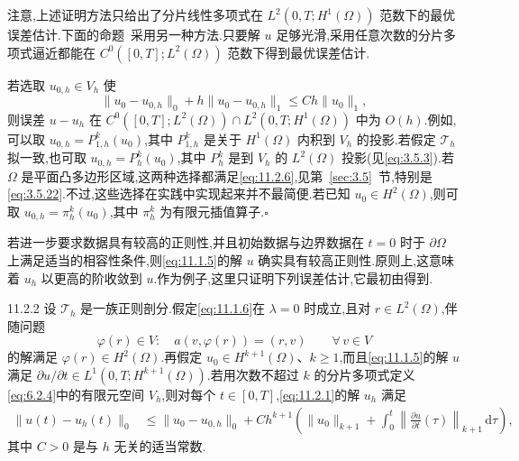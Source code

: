 注意,上述证明方法只给出了分片线性多项式在 \(L^2(0,T;H^1(\Omega))\) 范数下的最优误差估计.下面的命题~采用另一种方法.只要解 \(u\) 足够光滑,采用任意次数的分片多项式逼近都能在 \(C^0([0,T];L^2(\Omega))\) 范数下得到最优误差估计.

\begin{note}
若选取 \(u_{0,h}\in V_h\) 使
\begin{equation}\label{eq:11.2.6}
  \|u_0-u_{0,h}\|_0+h\|u_0-u_{0,h}\|_1\le Ch\|u_0\|_1,
\end{equation}
则误差 \(u-u_h\) 在 \(C^0([0,T];L^2(\Omega))\cap L^2(0,T;H^1(\Omega))\) 中为 \(O(h)\).例如,可以取 \(u_{0,h}=P_{1,h}^k(u_0)\),其中 \(P_{1,h}^k\) 是关于 \(H^1(\Omega)\) 内积到 \(V_h\) 的投影.若假定 \(\mathcal T_h\) 拟一致,也可取 \(u_{0,h}=P_h^k(u_0)\),其中 \(P_h^k\) 是到 \(V_h\) 的 \(L^2(\Omega)\) 投影(见\eqref{eq:3.5.3}).若 \(\Omega\) 是平面凸多边形区域,这两种选择都满足\eqref{eq:11.2.6},见第~\ref{sec:3.5}~节,特别是\eqref{eq:3.5.22}.不过,这些选择在实践中实现起来并不最简便.若已知 \(u_0\in H^2(\Omega)\),则可取 \(u_{0,h}=\pi_h^k(u_0)\),其中 \(\pi_h^k\) 为有限元插值算子.\hfill\(\square\)
\end{note}

若进一步要求数据具有较高的正则性,并且初始数据与边界数据在 \(t=0\) 时于 \(\partial\Omega\) 上满足适当的相容性条件,则\eqref{eq:11.1.5}的解 \(u\) 确实具有较高正则性.原则上,这意味着 \(u_h\) 以更高的阶收敛到 \(u\).作为例子,这里只证明下列误差估计,它最初由得到.

\begin{proposition}[]{11.2.2}
设 \(\mathcal T_h\) 是一族正则剖分.假定\eqref{eq:11.1.6}在 \(\lambda=0\) 时成立,且对 \(r\in L^2(\Omega)\),伴随问题
\[
  \varphi(r)\in V:\quad a(v,\varphi(r))=(r,v)\qquad\forall\,v\in V
\]
的解满足 \(\varphi(r)\in H^2(\Omega)\).再假定 \(u_0\in H^{k+1}(\Omega)\)、\(k\ge1\),而且\eqref{eq:11.1.5}的解 \(u\) 满足 \(\partial u/\partial t\in L^1(0,T;H^{k+1}(\Omega))\).若用次数不超过 \(k\) 的分片多项式定义\eqref{eq:6.2.4}中的有限元空间 \(V_h\),则对每个 \(t\in[0,T]\),\eqref{eq:11.2.1}的解 \(u_h\) 满足
\begin{equation}\label{eq:11.2.7}
  \begin{aligned}
    \|u(t)-u_h(t)\|_0
      &\le\|u_0-u_{0,h}\|_0
        +Ch^{k+1}\left(\|u_0\|_{k+1}+\int_0^t
               \left\|\frac{\partial u}{\partial t}(\tau)\right\|_{k+1}\,\mathrm d\tau\right),
  \end{aligned}
\end{equation}
其中 \(C>0\) 是与 \(h\) 无关的适当常数.
\end{proposition}

